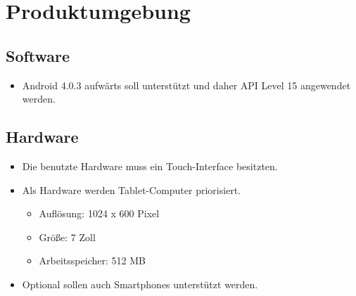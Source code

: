 \section{Produktumgebung}

\subsection{Software}
\begin{itemize}
	\item Android 4.0.3 aufwärts soll unterstützt und daher API Level 15 angewendet werden.
\end{itemize}
\subsection{Hardware}
\begin{itemize}
	\item Die benutzte Hardware muss ein Touch-Interface besitzten.
	\item Als Hardware werden Tablet-Computer priorisiert.
	\begin{itemize}
		\item Auflösung: 1024 x 600 Pixel
		\item Größe: 7 Zoll
		\item Arbeitsspeicher: 512 MB
	\end{itemize}
	\item Optional sollen auch Smartphones unterstützt werden.
\end{itemize}
